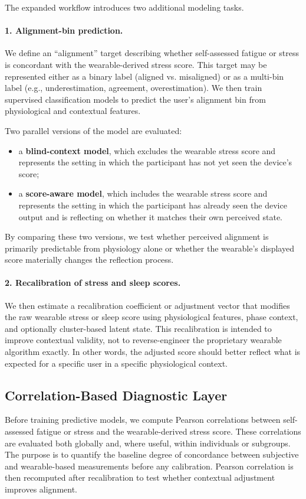The expanded workflow introduces two additional modeling tasks.

\paragraph{1. Alignment-bin prediction.}
We define an ``alignment'' target describing whether self-assessed fatigue or stress is concordant with the wearable-derived stress score. This target may be represented either as a binary label (aligned vs. misaligned) or as a multi-bin label (e.g., underestimation, agreement, overestimation). We then train supervised classification models to predict the user’s alignment bin from physiological and contextual features.

Two parallel versions of the model are evaluated:
\begin{itemize}
    \item a \textbf{blind-context model}, which excludes the wearable stress score and represents the setting in which the participant has not yet seen the device’s score;
    \item a \textbf{score-aware model}, which includes the wearable stress score and represents the setting in which the participant has already seen the device output and is reflecting on whether it matches their own perceived state.
\end{itemize}

By comparing these two versions, we test whether perceived alignment is primarily predictable from physiology alone or whether the wearable’s displayed score materially changes the reflection process.

\paragraph{2. Recalibration of stress and sleep scores.}
We then estimate a recalibration coefficient or adjustment vector that modifies the raw wearable stress or sleep score using physiological features, phase context, and optionally cluster-based latent state. This recalibration is intended to improve contextual validity, not to reverse-engineer the proprietary wearable algorithm exactly. In other words, the adjusted score should better reflect what is expected for a specific user in a specific physiological context.

\subsection{Correlation-Based Diagnostic Layer}
Before training predictive models, we compute Pearson correlations between self-assessed fatigue or stress and the wearable-derived stress score. These correlations are evaluated both globally and, where useful, within individuals or subgroups. The purpose is to quantify the baseline degree of concordance between subjective and wearable-based measurements before any calibration. Pearson correlation is then recomputed after recalibration to test whether contextual adjustment improves alignment.

